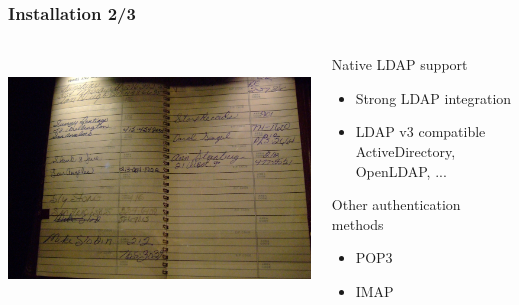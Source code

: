 \documentclass{beamer}
\begin{document}
\begin{frame}
    \frametitle{Installation 2/3}


 \begin{columns}
 \begin{column}{0.34\textwidth}
    \includegraphics[height=6.5cm]{pics/addressbook.jpg}
 \end{column}
 \begin{column}{0.90\textwidth}
    \begin{block}{Native LDAP support}
        \begin{itemize}
            \item Strong LDAP integration
            \item LDAP v3 compatible \\
            {\small ActiveDirectory, OpenLDAP, ...}
        \end{itemize}
    \end{block}

    \begin{block}{Other authentication methods}
        \begin{itemize}
            \item POP3
            \item IMAP
        \end{itemize}
    \end{block}
 \end{column}
\end{columns}
\end{frame}
\end{document}
